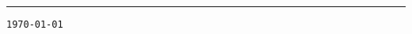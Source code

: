 


	\begin{exo}
		\donnee{}
	\end{exo}
	
	\begin{exo}
		\donnee{}
	\end{exo}
	
	\begin{exo}
		\donnee{}
	\end{exo}
	
	\begin{exo}
		\donnee{}
	\end{exo}
	
	\begin{exo}
		\donnee{}
	\end{exo}
	
	\vfill
	\hrule
	\vspace{2mm}
	 \hfill {\tt \tiny \today}

